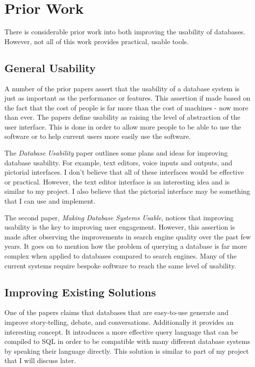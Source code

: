 \chapter{Prior Work}

There is considerable prior work into both improving the usability of
databases. However, not all of this work provides practical, usable tools.

\section{General Usability}

A number of the prior papers\cite{Date, Jagadish2007} assert that the usability
of a database system is just as important as the performance or features. This
assertion if made based on the fact that the cost of people is far more than
the cost of machines - now more than ever. The papers define usability as
raising the level of abstraction of the user interface. This is done in order
to allow more people to be able to use the software or to help current users
more easily use the software.

The \emph{Database Usability} paper\cite{Date} outlines some plans and ideas
for improving database usability. For example, text editors, voice inputs and
outputs, and pictorial interfaces. I don't believe that all of these interfaces
would be effective or practical. However, the text editor interface is an
interesting idea and is similar to my project. I also believe that the
pictorial interface may be something that I can use and implement.

The second paper, \emph{Making Database Systems Usable}, notices that improving
usability is the key to improving user engagement. However, this assertion is
made after observing the improvements in search engine quality over the past
few years. It goes on to mention how the problem of querying a database is far
more complex when applied to databases compared to search engines. Many of the
current systems require bespoke software to reach the same level of usability.

\section{Improving Existing Solutions}

One of the papers\cite{Stolte2010} claims that databases that are easy-to-use
generate and improve story-telling, debate, and conversations. Additionally it
provides an interesting concept. It introduces a more effective query language
that can be compiled to SQL in order to be compatible with many different
database systems by speaking their language directly. This solution is similar
to part of my project that I will discuss later.

